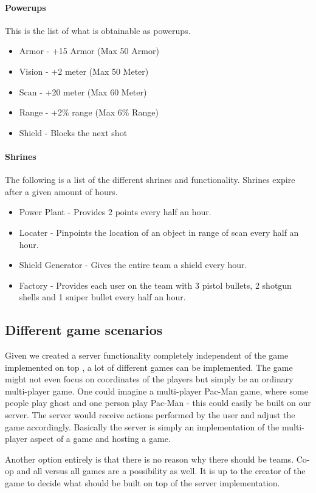 \paragraph{Powerups}
This is the list of what is obtainable as powerups.
\begin{itemize}
\item Armor - +15 Armor (Max 50 Armor)
\item Vision - +2 meter (Max 50 Meter)
\item Scan - +20 meter (Max 60 Meter)
\item Range - +2\% range (Max 6\% Range)
\item Shield - Blocks the next shot
\end{itemize}

\paragraph{Shrines}
The following is a list of the different shrines and functionality. Shrines expire after a given amount of hours.
\begin{itemize}
\item Power Plant - Provides 2 points every half an hour.
\item Locater - Pinpoints the location of an object in range of scan every half an hour.
\item Shield Generator - Gives the entire team a shield every hour.
\item Factory - Provides each user on the team with 3 pistol bullets, 2 shotgun shells and 1 sniper bullet every half an hour.
\end{itemize}

\subsection{Different game scenarios}\label{subsec:game-scenarios}
Given we created a server functionality completely independent of the game implemented on top , a lot of different games can be implemented. The game might not even focus on coordinates of the players but simply be an ordinary multi-player game. One could imagine a multi-player Pac-Man game, where some people play ghost and one person play Pac-Man - this could easily be built on our server. The server would receive actions performed by the user and adjust the game accordingly.
Basically the server is simply an implementation of the multi-player aspect of a game and hosting a game.

Another option entirely is that there is no reason why there should be teams. Co-op and all versus all games are a possibility as well. It is up to the creator of the game to decide what should be built on top of the server implementation.


